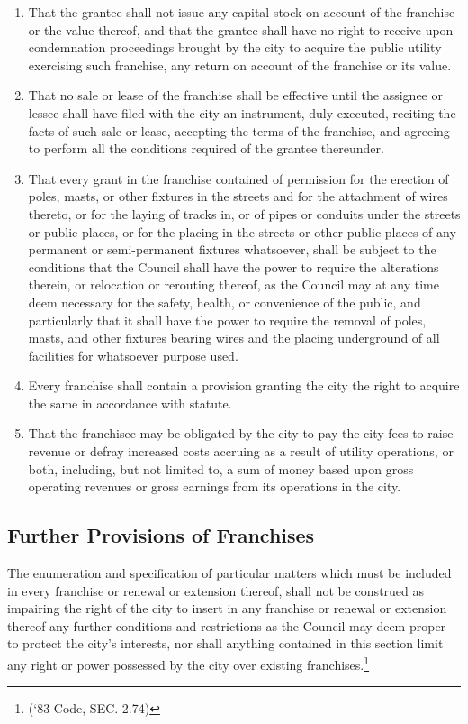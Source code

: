 \begin{enumerate}
    \item That the grantee shall not issue any capital stock on account of the franchise or the value thereof, and that the grantee shall have no right to receive upon condemnation proceedings brought by the city to acquire the public utility exercising such franchise, any return on account of the franchise or its value.
    \item That no sale or lease of the franchise shall be effective until the assignee or lessee shall have filed with the city an instrument, duly executed, reciting the facts of such sale or lease, accepting the terms of the franchise, and agreeing to perform all the conditions required of the grantee thereunder.
    \item That every grant in the franchise contained of permission for the erection of poles, masts, or other fixtures in the streets and for the attachment of wires thereto, or for the laying of tracks in, or of pipes or conduits under the streets or public places, or for the placing in the streets or other public places of any permanent or semi-permanent fixtures whatsoever, shall be subject to the conditions that the Council shall have the power to require the alterations therein, or relocation or rerouting thereof, as the Council may at any time deem necessary for the safety, health, or convenience of the public, and particularly that it shall have the power to require the removal of poles, masts, and other fixtures bearing wires and the placing underground of all facilities for whatsoever purpose used.
    \item Every franchise shall contain a provision granting the city the right to acquire the same in accordance with statute.
    \item That the franchisee may be obligated by the city to pay the city fees to raise revenue or defray increased costs accruing as a result of utility operations, or both, including, but not limited to, a sum of money based upon gross operating revenues or gross earnings from its operations in the city.
\end{enumerate}
\subsection{Further Provisions of Franchises}
The enumeration and specification of particular matters which must be included in every franchise or renewal or extension thereof, shall not be construed as impairing the right of the city to insert in any franchise or renewal or extension thereof any further conditions and restrictions as the Council may deem proper to protect the city’s interests, nor shall anything contained in this section limit any right or power possessed by the city over existing franchises.\footnote{(‘83 Code, SEC. 2.74)}

